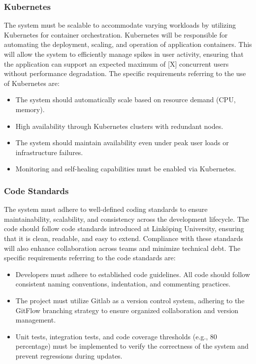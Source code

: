 \documentclass{article}
\begin{document}
\subsubsection{Kubernetes}
The system must be scalable to accommodate varying workloads by utilizing Kubernetes for container orchestration. Kubernetes will be responsible for automating the deployment, scaling, and operation of application containers. This will allow the system to efficiently manage spikes in user activity, ensuring that the application can support an expected maximum of [X] concurrent users without performance degradation. The specific requirements referring to the use of Kubernetes are:
\begin{itemize}
    \item 
The system should automatically scale based on resource demand (CPU, memory).
    \item 
High availability through Kubernetes clusters with redundant nodes.
    \item 
The system should maintain availability even under peak user loads or infrastructure failures.
    \item 
Monitoring and self-healing capabilities must be enabled via Kubernetes.
\end{itemize}

\subsubsection{Code Standards}
The system must adhere to well-defined coding standards to ensure maintainability, scalability, and consistency across the development lifecycle. The code should follow code standards introduced at Linköping University, ensuring that it is clean, readable, and easy to extend. Compliance with these standards will also enhance collaboration across teams and minimize technical debt. The specific requirements referring to the code standards are:

\begin{itemize}
    \item 
Developers must adhere to established code guidelines. All code should follow consistent naming conventions, indentation, and commenting practices.
    \item 
The project must utilize Gitlab as a version control system, adhering to the GitFlow branching strategy to ensure organized collaboration and version management.
    \item 
Unit tests, integration tests, and code coverage thresholds (e.g., 80 percentage) must be implemented to verify the correctness of the system and prevent regressions during updates.
\end{itemize}
\end{document}

